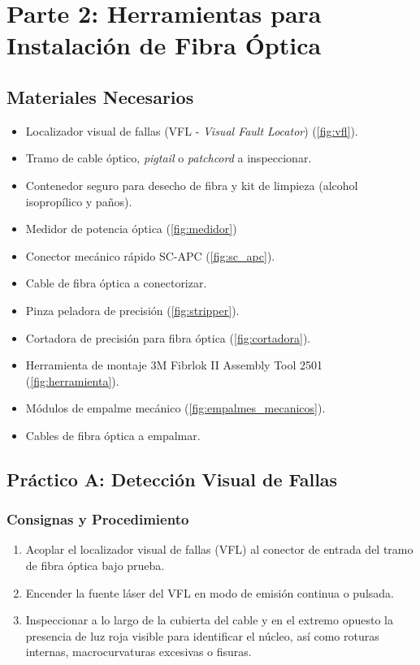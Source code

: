 \section{Parte 2: Herramientas para Instalación de Fibra Óptica}

\subsection{Materiales Necesarios}
\begin{itemize}
    \item Localizador visual de fallas (VFL - \textit{Visual Fault Locator}) (\autoref{fig:vfl}).
    \item Tramo de cable óptico, \textit{pigtail} o \textit{patchcord} a inspeccionar.
    \item Contenedor seguro para desecho de fibra y kit de limpieza (alcohol isopropílico y paños).
    \item Medidor de potencia óptica (\autoref{fig:medidor})
    \item Conector mecánico rápido SC-APC (\autoref{fig:sc_apc}).
    \item Cable de fibra óptica a conectorizar.
    \item Pinza peladora de precisión (\autoref{fig:stripper}).
    \item Cortadora de precisión para fibra óptica (\autoref{fig:cortadora}).
    \item Herramienta de montaje 3M Fibrlok II Assembly Tool 2501 (\autoref{fig:herramienta}).
    \item Módulos de empalme mecánico (\autoref{fig:empalmes_mecanicos}).
    \item Cables de fibra óptica a empalmar.
\end{itemize}


\subsection{Práctico A: Detección Visual de Fallas}

\subsubsection*{Consignas y Procedimiento}
\begin{enumerate}
    \item Acoplar el localizador visual de fallas (VFL) al conector de entrada del tramo de fibra óptica bajo prueba.
    \item Encender la fuente láser del VFL en modo de emisión continua o pulsada.
    \item Inspeccionar a lo largo de la cubierta del cable y en el extremo opuesto la presencia de luz roja visible para identificar el núcleo, así como roturas internas, macrocurvaturas excesivas o fisuras.
    
\end{enumerate}

